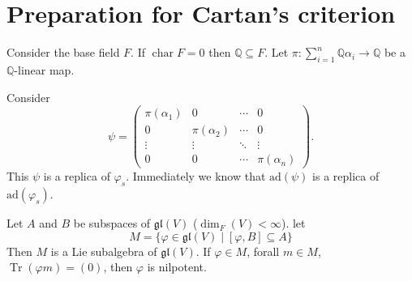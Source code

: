 \section{Preparation for Cartan's criterion}

Consider the base field $F$. If $\operatorname{char}F=0$ then $\mathbb{Q}\subseteq F$. Let $\pi: \sum\limits_{i=1}^n \mathbb{Q}\alpha_i \to \mathbb{Q}$ be a $\mathbb{Q}$-linear map.

Consider
\[
    \psi=
    \begin{pmatrix}
        \pi(\alpha_1) & 0             & \cdots & 0             \\
        0             & \pi(\alpha_2) & \cdots & 0             \\
        \vdots        & \vdots        & \ddots & \vdots        \\
        0             & 0             & \cdots & \pi(\alpha_n)
    \end{pmatrix}.
\]
This $\psi$ is a replica of $\varphi_s$. Immediately we know that $\mathrm{ad}(\psi)$ is a replica of $\mathrm{ad}(\varphi_s)$.

\begin{lemma}
    Let $A$ and $B$ be subspaces of $\mathfrak{gl}(V)$ ($\operatorname{dim}_F(V)<\infty$). let
    \[
        M=\{ \varphi \in \mathfrak{gl}(V) \mid [\varphi,B] \subseteq A \}
    \]
    Then $M$ is a Lie subalgebra of $\mathfrak{gl}(V)$. If $\varphi \in M$, forall $m \in M$, $\operatorname{Tr}(\varphi m)=(0)$, then $\varphi$ is nilpotent.
\end{lemma}

